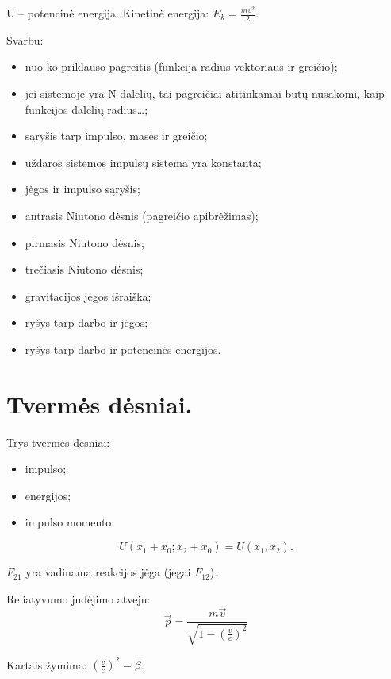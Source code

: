 U – potencinė energija. Kinetinė energija: $E_{k} = \frac{mv^{2}}{2}$.

Svarbu:
\begin{itemize}
  \item nuo ko priklauso pagreitis (funkcija radius vektoriaus ir greičio);
  \item jei sistemoje yra N dalelių, tai pagreičiai atitinkamai būtų
    nusakomi, kaip funkcijos dalelių radius…;
  \item sąryšis tarp impulso, masės ir greičio;
  \item uždaros sistemos impulsų sistema yra konstanta;
  \item jėgos ir impulso sąryšis;
  \item antrasis Niutono dėsnis (pagreičio apibrėžimas);
  \item pirmasis Niutono dėsnis;
  \item trečiasis Niutono dėsnis;
  \item gravitacijos jėgos išraiška;
  \item ryšys tarp darbo ir jėgos;
  \item ryšys tarp darbo ir potencinės energijos.
\end{itemize}

\section{Tvermės dėsniai.}

Trys tvermės dėsniai:
\begin{itemize}
  \item impulso;
  \item energijos;
  \item impulso momento.
\end{itemize}

\begin{equation*}
  U(x_{1} + x_{0}; x_{2}+x_{0}) = U(x_{1},x_{2}).
\end{equation*}

$F_{21}$ yra vadinama reakcijos jėga (jėgai $F_{12}$).

Reliatyvumo judėjimo atveju:
\begin{equation*}
  \vec{p} = \frac{m\vec{v}}{\sqrt{1 - (\frac{v}{c})^{2}}}
\end{equation*}

\begin{note}
  Kartais žymima: $\left( \frac{v}{c} \right)^{2} = \beta$.
\end{note}

